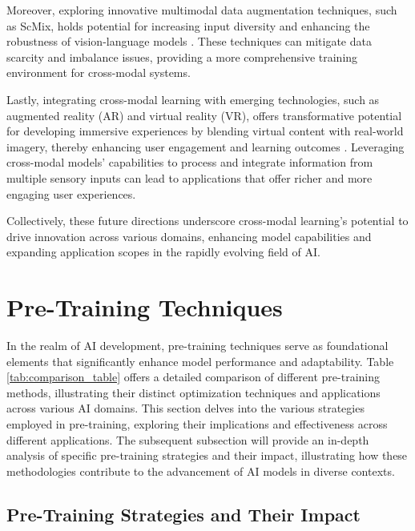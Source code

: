 Moreover, exploring innovative multimodal data augmentation techniques, such as ScMix, holds potential for increasing input diversity and enhancing the robustness of vision-language models \cite{zhang2024universaladversarialperturbationsvisionlanguage}. These techniques can mitigate data scarcity and imbalance issues, providing a more comprehensive training environment for cross-modal systems.

Lastly, integrating cross-modal learning with emerging technologies, such as augmented reality (AR) and virtual reality (VR), offers transformative potential for developing immersive experiences by blending virtual content with real-world imagery, thereby enhancing user engagement and learning outcomes \cite{legendre2020learningilluminationdiverseportraits}. Leveraging cross-modal models' capabilities to process and integrate information from multiple sensory inputs can lead to applications that offer richer and more engaging user experiences.

Collectively, these future directions underscore cross-modal learning's potential to drive innovation across various domains, enhancing model capabilities and expanding application scopes in the rapidly evolving field of AI.




\section{Pre-Training Techniques} \label{sec:Pre-Training Techniques}


In the realm of AI development, pre-training techniques serve as foundational elements that significantly enhance model performance and adaptability. Table \ref{tab:comparison_table} offers a detailed comparison of different pre-training methods, illustrating their distinct optimization techniques and applications across various AI domains. This section delves into the various strategies employed in pre-training, exploring their implications and effectiveness across different applications. The subsequent subsection will provide an in-depth analysis of specific pre-training strategies and their impact, illustrating how these methodologies contribute to the advancement of AI models in diverse contexts.






\subsection{Pre-Training Strategies and Their Impact} \label{subsec:Pre-Training Strategies and Their Impact}


